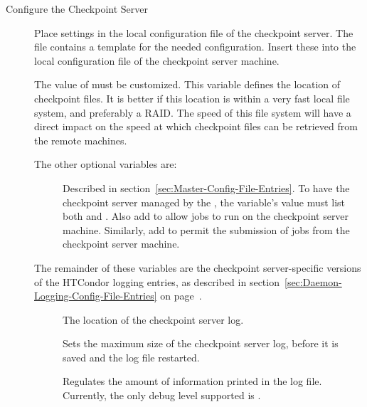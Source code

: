 \begin{description}

\item[Configure the Checkpoint Server]

Place settings in the local configuration file of
the checkpoint server.
The file  contains
a template for the needed configuration. Insert these into the local
configuration file of the checkpoint server machine. 

The value of   
must be customized.
This variable defines the location of checkpoint files.
It is better if this location is within a very fast local file system,
and preferably a RAID. 
The speed of this file system will have a direct impact on the speed
at which checkpoint files can be retrieved from the remote machines. 

The other optional variables are:
\begin{description}

\item[] Described in
section~\ref{sec:Master-Config-File-Entries}.  
To have the checkpoint server managed by the ,
the  variable's value must list both 
and .
Also add  to allow jobs to run on the checkpoint server machine.
Similarly, add  to permit the submission of jobs from the
checkpoint server machine. 

\end{description}

The remainder of these variables are the checkpoint server-specific versions
of the HTCondor logging entries, as described in
section~\ref{sec:Daemon-Logging-Config-File-Entries} on
page~\pageref{sec:Daemon-Logging-Config-File-Entries}.
\begin{description}

\item[] The location of the checkpoint server log.

\item[] Sets the maximum
size of the checkpoint server log, before it is saved and the
log file restarted.

\item[] Regulates the amount of information
printed in the log file.
Currently, the only debug level supported is .


\end{description}
\end{description}
